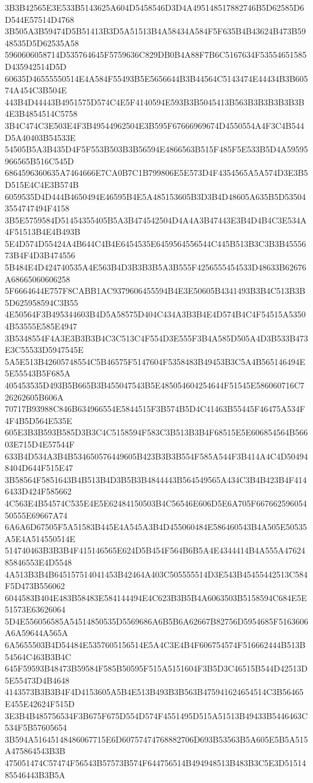 {{{{{{{{{{{{{{{{{{{{{3B3B42565E3E533B5143625A604D5458546D3D4A495148517882746B5D62585D6D544E57514D4768
3B505A3B59474D5B51413B3D5A51513B4A58434A584F5F635B4B43624B473B5948535D5D62535A58
5960606058714D535764645F5759636C829DB0B4A88F7B6C5167634F53554651585D435942514D5D
60635D46555550514E4A584F55493B5E5656644B3B44564C5143474E44434B3B60574A454C3B504E
443B4D44443B4951575D574C4E5F4140594E593B3B5045413B563B3B3B3B3B3B4E3B4854514C5758
3B4C474C3E503E4F3B49544962504E3B595F67666969674D4550554A4F3C4B544D5A40403B54533E
54505B5A3B435D4F5F553B503B3B56594E4866563B515F485F5E533B5D4A59595966565B516C545D
6864596360635A7464666E7CA0B7C1B799806E5E573D4F4354565A5A574D3E3B5D515E4C4E3B574B
6059535D4D444B4650494E46595B4E5A485153605B3D3B4D48605A635B5D535043554747494F4158
3B5E5759584D51454355405B5A3B474542504D4A4A3B47443E3B4D4B4C3E534A4F51513B4E4B493B
5E4D574D55424A4B644C4B4E6454535E6459564556544C445B513B3C3B3B4555673B4F4D3B474556
5B484E4D424740535A4E563B4D3B3B3B5A3B555F4256555454533D48633B62676A68665060606258
5F6664644E757F8CABB1AC9379606455594B4E3E50605B4341493B3B4C513B3B5D625958594C3B55
4E50564F3B495344603B4D5A58575D404C434A3B3B4E4D574B4C4F54515A53504B53555E585E4947
3B5348554F4A3E3B3B3B4C3C513C4F554D3E555F3B4A585D505A4D3B533B473E3C55533D5947545E
5A5E513B42605748554C5B46575F5147604F5358483B49453B3C5A4B565146494E5E55543B5F685A
405453535D493B5B665B3B455047543B5E485054604254644F51545E586060716C726262605B606A
70717B93988C846B634966554E5844515F3B574B5D4C41463B55445F46475A534F4F4B5D564E535E
605E3B3B593B585D3B3C4C5158594F583C3B513B3B4F68515E5E606854564B56603E715D4E57544F
633B4D534A3B4B534650576449605B423B3B3B554F585A544F3B414A4C4D504948404D644F515E47
3B58564F5851643B4B513B4D3B5B3B4844443B564549565A434C3B4B423B4F4146433D424F585662
4C563E4B54574C535E4E5E62484150503B4C56546E606D5E6A705F66766259605450555E69667A74
6A6A6D67505F5A51583B445E4A545A3B4D455060484E586460543B4A505E50535A5E4A514550514E
514740463B3B3B4F415146565E624D5B454F564B6B5A4E4344414B4A555A4762485846553E4D5548
4A513B3B4B645157514041453B42464A403C505555514D3E543B45455442513C584F5D473B556062
6044583B404E483B58483E584144494E4C623B3B5B4A6063503B5158594C684E5E51573E63626064
5D4E556056585A54514850535D5569686A6B5B6A62667B82756D5954685F5163606A6A59644A565A
6A5655503B4D54484E5357605156514E5A4C3E4B4F606754574F516662444B513B54564C463B3B4C
645F59593B48473B59584F585B50595F515A5151604F3B5D3C46515B544D42513D5E55473D4B4648
4143573B3B3B4F4D4153605A5B4E513B493B3B563B475941624654514C3B56465E455E42624F515D
3E3B4B485756534F3B675F675D554D574F4551495D515A51513B49433B5446463C534F5B57605654
3B594A51645148486067715E6D60757474768882706D693B53563B5A605E5B5A515A475864543B3B
475051474C57474F56543B57573B574F644756514B494948513B483B3C5E3D5151485546443B3B5A
}}}}}}}}}}}}}}}}}}}}}

